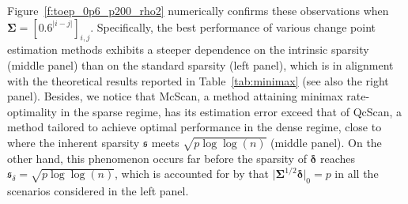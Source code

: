 \documentclass[11pt, a4paper]{article}
\theoremstyle{definition}
\theoremstyle{definition}
\theoremstyle{definition}
\theoremstyle{definition}
\theoremstyle{definition}
\theoremstyle{remark}
\theoremstyle{definition}
\theoremstyle{definition}
\theoremstyle{definition}
\begin{document}
Figure~\ref{f:toep_0p6_p200_rho2} numerically confirms these observations when $\bm\Sigma = [0.6^{\vert i - j \vert}]_{i, j}$. Specifically, the best performance of various change point estimation methods exhibits a steeper dependence on the intrinsic sparsity (middle panel) than on the standard sparsity (left panel), which is in alignment with the theoretical results reported in Table~\ref{tab:minimax} (see also the right panel). Besides, we notice that McScan, a method attaining minimax rate-optimality in the sparse regime, has its estimation error exceed that of QcScan, a method tailored to achieve optimal performance in the dense regime, close to where the inherent sparsity $\mathfrak{s}$ meets $\sqrt{p{\log\log (n)}}$ (middle panel). On the other hand, this phenomenon occurs far before the sparsity of $\bm\delta$ reaches $\mathfrak{s}_\delta = \sqrt{p{\log\log (n)}}$, which is accounted for by that $\vert \bm\Sigma^{1/2} \bm\delta \vert_0 = p$ in all the scenarios considered in the left panel.
\end{document}
